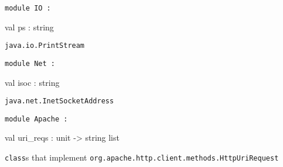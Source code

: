 \documentclass[11pt]{article}
\begin{document}
\begin{ocamldoccode}
{\tt{module }}{\tt{IO}}{\tt{ : }}\end{ocamldoccode}
\label{module:Java.IO}

\begin{ocamldocsigend}


\label{val:Java.IO.ps}\begin{ocamldoccode}
val ps : string
\end{ocamldoccode}
\begin{ocamldocdescription}
{\tt{java.io.PrintStream}}


\end{ocamldocdescription}
\end{ocamldocsigend}






\begin{ocamldoccode}
{\tt{module }}{\tt{Net}}{\tt{ : }}\end{ocamldoccode}
\label{module:Java.Net}

\begin{ocamldocsigend}


\label{val:Java.Net.isoc}\begin{ocamldoccode}
val isoc : string
\end{ocamldoccode}
\begin{ocamldocdescription}
{\tt{java.net.InetSocketAddress}}


\end{ocamldocdescription}
\end{ocamldocsigend}






\begin{ocamldoccode}
{\tt{module }}{\tt{Apache}}{\tt{ : }}\end{ocamldoccode}
\label{module:Java.Apache}

\begin{ocamldocsigend}


\label{val:Java.Apache.uri-underscorereqs}\begin{ocamldoccode}
val uri_reqs : unit -> string list
\end{ocamldoccode}
\begin{ocamldocdescription}
{\tt{class}}s that implement {\tt{org.apache.http.client.methods.HttpUriRequest}}


\end{ocamldocdescription}
\end{ocamldocsigend}
\end{document}
